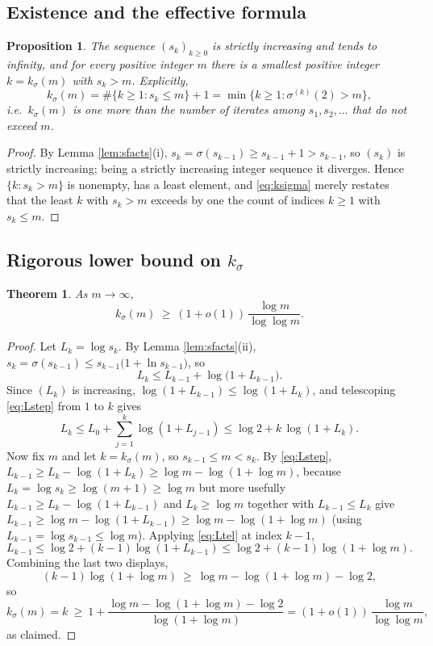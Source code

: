 \documentclass{amsart}
\newtheorem{theorem}{Theorem}
\newtheorem{proposition}{Proposition}
\theoremstyle{definition}
\begin{document}
\subsection{Existence and the effective formula}

\begin{proposition}\label{prop:exist}
The sequence $(s_k)_{k\ge0}$ is strictly increasing and tends to infinity, and
for every positive integer $m$ there is a smallest positive integer
$k=k_\sigma(m)$ with $s_k>m$. Explicitly,
\begin{equation}\label{eq:ksigma}
k_\sigma(m)=\#\{k\ge1: s_{k}\le m\}+1=\min\{k\ge1:\sigma^{(k)}(2)>m\},
\end{equation}
i.e.\ $k_\sigma(m)$ is one more than the number of iterates among
$s_1,s_2,\dots$ that do not exceed $m$.
\end{proposition}

\begin{proof}
By Lemma \ref{lem:sfacts}(i), $s_k=\sigma(s_{k-1})\ge s_{k-1}+1>s_{k-1}$, so
$(s_k)$ is strictly increasing; being a strictly increasing integer sequence it
diverges. Hence $\{k:s_k>m\}$ is nonempty, has a least element, and
\eqref{eq:ksigma} merely restates that the least $k$ with $s_k>m$ exceeds by
one the count of indices $k\ge1$ with $s_k\le m$.
\end{proof}

\subsection{Rigorous lower bound on $k_\sigma$}

\begin{theorem}\label{thm:klow}
As $m\to\infty$,
\[
k_\sigma(m)\ \ge\ (1+o(1))\,\frac{\log m}{\log\log m}.
\]
\end{theorem}

\begin{proof}
Let $L_k=\log s_k$. By Lemma \ref{lem:sfacts}(ii),
$s_{k}=\sigma(s_{k-1})\le s_{k-1}\bigl(1+\ln s_{k-1}\bigr)$, so
\begin{equation}\label{eq:Lstep}
L_{k}\le L_{k-1}+\log\!\bigl(1+L_{k-1}\bigr).
\end{equation}
Since $(L_k)$ is increasing, $\log(1+L_{k-1})\le\log(1+L_{k})$, and telescoping
\eqref{eq:Lstep} from $1$ to $k$ gives
\begin{equation}\label{eq:Ltel}
L_k\le L_0+\sum_{j=1}^{k}\log(1+L_{j-1})
     \le \log 2 + k\,\log(1+L_k).
\end{equation}
Now fix $m$ and let $k=k_\sigma(m)$, so $s_{k-1}\le m<s_k$. By \eqref{eq:Lstep},
$L_{k-1}\ge L_k-\log(1+L_k)\ge \log m-\log(1+\log m)$, because
$L_k=\log s_k\ge\log(m+1)\ge\log m$ but more usefully
$L_{k-1}\ge L_k-\log(1+L_{k-1})$ and $L_k\ge\log m$ together with
$L_{k-1}\le L_k$ give
$L_{k-1}\ge\log m-\log(1+L_{k-1})\ge\log m-\log(1+\log m)$
(using $L_{k-1}=\log s_{k-1}\le\log m$). Applying \eqref{eq:Ltel} at index
$k-1$,
\[
L_{k-1}\le \log 2+(k-1)\log(1+L_{k-1})\le\log2+(k-1)\log(1+\log m).
\]
Combining the last two displays,
\[
(k-1)\log(1+\log m)\ \ge\ \log m-\log(1+\log m)-\log2,
\]
so
\[
k_\sigma(m)=k\ \ge\ 1+\frac{\log m-\log(1+\log m)-\log2}{\log(1+\log m)}
=(1+o(1))\,\frac{\log m}{\log\log m},
\]
as claimed.
\end{proof}
\end{document}
